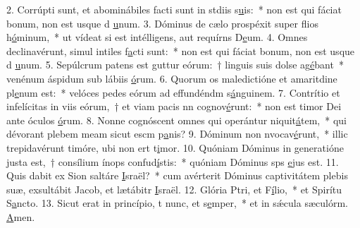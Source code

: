2. Corrúpti sunt, et abominábiles facti sunt in stdiis s\uline{u}is:~* non est qui fáciat bonum, non est usque d \uline{u}num.
3. Dóminus de cælo prospéxit super flios h\uline{ó}minum,~* ut vídeat si est intélligens, aut requírns D\uline{e}um.
4. Omnes declinavérunt, simul intiles f\uline{a}cti sunt:~* non est qui fáciat bonum, non est usque d \uline{u}num.
5. Sepúlcrum patens est guttur eórum:~† linguis suis dolse ag\uline{é}bant~* venénum áspidum sub lábiis \uline{ó}rum.
6. Quorum os maledictióne et amaritdine pl\uline{e}num est:~* velóces pedes eórum ad effundéndm s\uline{á}nguinem.
7. Contrítio et infelícitas in viis eórum,~† et viam pacis nn cognov\uline{é}runt:~* non est timor Dei ante óculos \uline{ó}rum.
8. Nonne cognóscent omnes qui operántur niquit\uline{á}tem,~* qui dévorant plebem meam sicut escm p\uline{a}nis?
9. Dóminum non nvocav\uline{é}runt,~* illic trepidavérunt timóre, ubi non ert t\uline{i}mor.
10. Quóniam Dóminus in generatióne justa est,~† consílium ínops confud\uline{í}stis:~* quóniam Dóminus sps \uline{e}jus est.
11. Quis dabit ex Sion saltáre \uline{I}sraël?~* cum avérterit Dóminus captivitátem plebis suæ, exsultábit Jacob, et lætábitr \uline{I}sraël.
12. Glória Ptri, et F\uline{í}lio,~* et Spirítu S\uline{a}ncto.
13. Sicut erat in princípio, t nunc, et s\uline{e}mper,~* et in sǽcula sæculórm. \uline{A}men.
